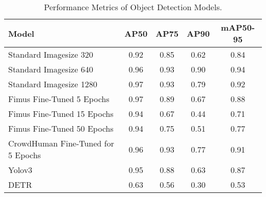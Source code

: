\begin{table}[H]
    \centering
    \renewcommand{\arraystretch}{1.5} %
    \setlength{\tabcolsep}{1em}
    \begin{tabular}{|l|c|c|c|c|}
        \hline
        \rowcolor{gray!25}
        \textbf{Model} & \textbf{AP50} & \textbf{AP75} & \textbf{AP90} & \textbf{mAP50-95} \\ \hline
		Standard Imagesize 320 		           & 0.92 & 0.85 & 0.62 & 0.84 \\ \hline
		Standard Imagesize 640 		           & 0.96 & 0.93 & 0.90 & 0.94 \\ \hline
		Standard Imagesize 1280		           & 0.97 & 0.93 & 0.79 & 0.92 \\ \hline
		Fimus Fine-Tuned 5 Epochs              & 0.97 & 0.89 & 0.67 & 0.88 \\ \hline
		Fimus Fine-Tuned 15 Epochs             & 0.94 & 0.67 & 0.44 & 0.71 \\ \hline
		Fimus Fine-Tuned 50 Epochs             & 0.94 & 0.75 & 0.51 & 0.77 \\ \hline
		CrowdHuman Fine-Tuned for 5 Epochs	   & 0.96 & 0.93 & 0.77 & 0.91 \\ \hline
		Yolov3 							       & 0.95 & 0.88 & 0.63 & 0.87 \\ \hline
		DETR 							       & 0.63 & 0.56 & 0.30 & 0.53 \\ \hline 
    \end{tabular}
    \caption{\centering Performance Metrics of Object Detection Models. }
    \label{tab:performance_metrics}
\end{table}

